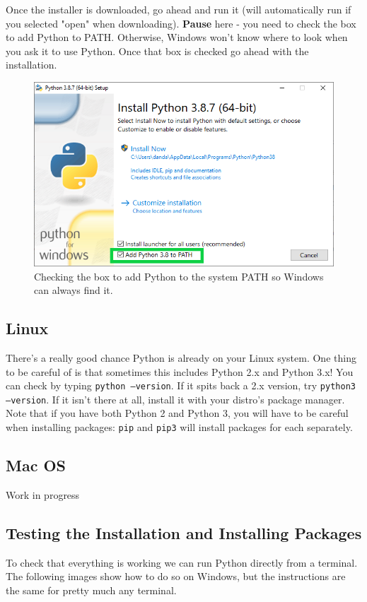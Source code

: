 \documentclass[oneside]{book}
\begin{document}
Once the installer is downloaded, go ahead and run it (will automatically run if you selected "open" when downloading). \textbf{Pause} here - you need to check the box to add Python to PATH. Otherwise, Windows won't know where to look when you ask it to use Python. Once that box is checked go ahead with the installation.

\begin{figure}[H]
\centering
\includegraphics[width=0.7\linewidth]{./img/pyInstaller.PNG}
\caption{Checking the box to add Python to the system PATH so Windows can always find it.}
\label{fig:pyInstaller}
\end{figure}

\subsection{Linux}

There's a really good chance Python is already on your Linux system. One thing to be careful of is that sometimes this includes Python 2.x and Python 3.x! You can check by typing \texttt{python --version}. If it spits back a 2.x version, try \texttt{python3 --version}. If it isn't there at all, install it with your distro's package manager. Note that if you have both Python 2 and Python 3, you will have to be careful when installing packages: \texttt{pip} and \texttt{pip3} will install packages for each separately.

\subsection{Mac OS}

Work in progress

\subsection{Testing the Installation and Installing Packages}

To check that everything is working we can run Python directly from a terminal. The following images show how to do so on Windows, but the instructions are the same for pretty much any terminal.
\end{document}
